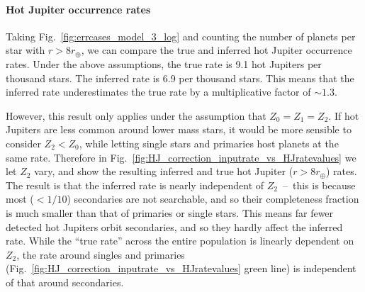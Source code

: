 \paragraph{Hot Jupiter occurrence rates}
Taking Fig.~\ref{fig:errcases_model_3_log} and counting the number of planets 
per star with $r>8r_\oplus$, we can compare the true and inferred hot Jupiter 
occurrence rates.
Under the above assumptions, the true rate is 9.1 hot Jupiters 
per thousand stars.
The inferred rate is 6.9 per thousand stars.
This means that the inferred rate underestimates the true rate by a 
multiplicative factor of $\sim\!1.3$.

However, this result only applies under the assumption that $Z_0 = 
Z_1 = Z_2$.
If hot Jupiters are less common around lower mass stars, it would be more 
sensible to consider $Z_2<Z_0$, while letting single stars and 
primaries host planets at the same rate.
Therefore in Fig.~\ref{fig:HJ_correction_inputrate_vs_HJratevalues} we let 
$Z_2$ vary, and show the resulting inferred and true hot Jupiter 
($r>8r_\oplus$) rates.
The result is that the inferred rate is nearly independent of 
$Z_2$~--~this is because most ($<1/10$) secondaries are not searchable, 
and so their completeness fraction is much smaller than that of primaries or 
single stars.
This means far fewer detected hot Jupiters orbit secondaries, and so they 
hardly affect the inferred rate.
While the ``true rate'' across the entire population is linearly dependent on 
$Z_2$, the rate around 
singles and primaries (Fig.~\ref{fig:HJ_correction_inputrate_vs_HJratevalues} 
green line) is independent of that around secondaries.

